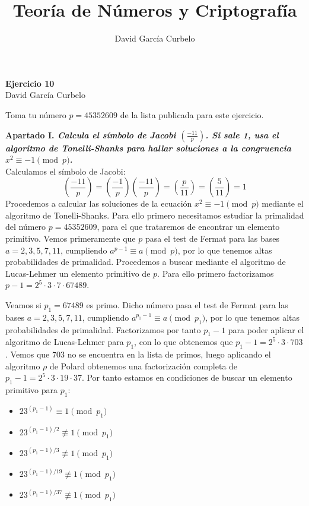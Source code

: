 \documentclass[fleqn]{article}
\author{David García Curbelo}
\title{Teoría de Números y Criptografía}
\begin{document}
    \begin{center}
        \LARGE{\textbf{Ejercicio 10}} \\
        \Large{David García Curbelo} \\
    \end{center}

    \vspace{1cm}
    Toma tu número $p = 45352609$ de la lista publicada para este ejercicio.

    \textbf{Apartado I. \textit{Calcula el símbolo de Jacobi $\left(\frac{-11}{p}\right)$. Si sale 1, usa el algoritmo de 
                                Tonelli-Shanks para hallar soluciones a la congruencia $x^2 \equiv -1 \pmod{p}$.}}\\
    
    Calculamos el símbolo de Jacobi: 
    $$\left(\frac{-11}{p}\right) = \left(\frac{-1}{p}\right) \left(\frac{-11}{p}\right) = \left(\frac{p}{11}\right) 
    = \left(\frac{5}{11}\right) = 1$$
    Procedemos a calcular las soluciones de la ecuación $x^2 \equiv -1 \pmod{p}$ mediante el algoritmo de Tonelli-Shanks.
    Para ello primero necesitamos estudiar la primalidad del número $p = 45352609$, para el que trataremos de encontrar un
    elemento primitivo. Vemos primeramente que $p$ pasa el test de Fermat para las bases $a = 2,3,5,7,11$, cumpliendo
    $a^{p-1} \equiv a \pmod{p}$, por lo que tenemos altas probabilidades de primalidad. Procedemos a buscar mediante el algoritmo
    de Lucas-Lehmer un elemento primitivo de $p$. Para ello primero factorizamos $p - 1 = 2^5 \cdot 3 \cdot 7 \cdot 67489$.
    
    Veamos si $p_1 = 67489$ es primo. Dicho número pasa el test de Fermat para las bases $a = 2,3,5,7,11$, cumpliendo
    $a^{p_1-1} \equiv a \pmod{p_1}$, por lo que tenemos altas probabilidades de primalidad. Factorizamos por tanto $p_1 - 1 $
    para poder aplicar el algoritmo de Lucas-Lehmer para $p_1$, con lo que obtenemos que $p_1 - 1 = 2^5 \cdot 3 \cdot 703$.
    Vemos que 703 no se encuentra en la lista de primos, luego aplicando el algoritmo $\rho$ de Polard obtenemos una factorización 
    completa de  $p_1 - 1 = 2^5 \cdot 3 \cdot 19 \cdot 37$. Por tanto estamos en condiciones de buscar un elemento primitivo para 
    $p_1$: 

    \begin{itemize}
        \item $23^{(p_1 - 1)} \equiv 1 \pmod{p_1}$
        \item $23^{(p_1 - 1)/2} \not\equiv 1 \pmod{p_1}$    
        \item $23^{(p_1 - 1)/3} \not\equiv 1 \pmod{p_1}$
        \item $23^{(p_1 - 1)/19} \not\equiv 1 \pmod{p_1}$
        \item $23^{(p_1 - 1)/37} \not\equiv 1 \pmod{p_1}$
    \end{itemize}
\end{document}
